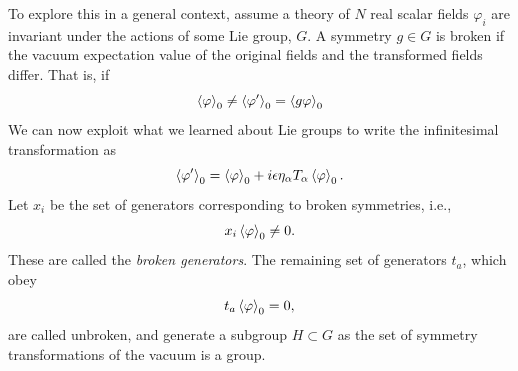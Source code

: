 To explore this in a general context, assume a theory of $N$ real scalar fields $\varphi_i$ are invariant under the actions of some Lie group, $G$.
A symmetry $g \in G$ is broken if the vacuum expectation value of the original fields and the transformed fields differ.
That is, if
%
\begin{equation}
    \left\langle \varphi \right\rangle_0 \neq \left\langle \varphi' \right\rangle_0 = \left\langle g \varphi \right\rangle_0
\end{equation}
%
We can now exploit what we learned about Lie groups to write the infinitesimal transformation as
%
\begin{equation}
    \left\langle \varphi' \right\rangle_0 = \left\langle \varphi \right\rangle_0 + i \epsilon \eta_\alpha T_\alpha \left\langle \varphi \right\rangle_0.
\end{equation}
%
Let $x_i$ be the set of generators corresponding to broken symmetries, i.e.,
%
\begin{equation}
    x_i \left\langle \varphi \right\rangle_0 \neq 0.
\end{equation}
%
These are called the \emph{broken generators}.
The remaining set of generators $t_a$, which obey
%
\begin{equation}
    t_a \left\langle \varphi \right\rangle_0 = 0,
\end{equation}
%
are called unbroken, and generate a subgroup $H \subset G$ as the set of symmetry transformations of the vacuum is a group.

